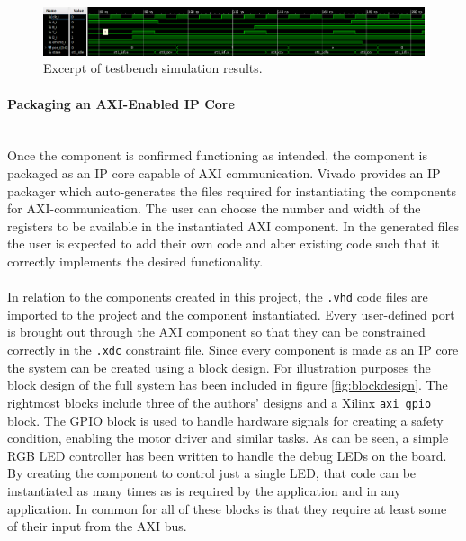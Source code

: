 \begin{figure}[h]
	\centering
	\includegraphics[width=\linewidth]{graphics/test_bench_narrow}
	\caption{Excerpt of testbench simulation results.}
	\label{fig:testbench}
\end{figure}

\paragraph{Packaging an AXI-Enabled IP Core}~\\ %
\label{par:ip_cores}
Once the component is confirmed functioning as intended, the component is packaged as an IP core capable of AXI communication.
Vivado provides an IP packager which auto-generates the files required for instantiating the components for AXI-communication.
The user can choose the number and width of the registers to be available in the instantiated AXI component.
In the generated files the user is expected to add their own code and alter existing code such that it correctly implements the desired functionality.
\\~\\
In relation to the components created in this project, the \texttt{.vhd} code files are imported to the project and the component instantiated.
Every user-defined port is brought out through the AXI component so that they can be constrained correctly in the \texttt{.xdc} constraint file.
Since every component is made as an IP core the system can be created using a block design.
For illustration purposes the block design of the full system has been included in figure \ref{fig:blockdesign}.
The rightmost blocks include three of the authors' designs and a Xilinx \texttt{axi\_gpio} block.
The GPIO block is used to handle hardware signals for creating a safety condition, enabling the motor driver and similar tasks.
As can be seen, a simple RGB LED controller has been written to handle the debug LEDs on the board.
By creating the component to control just a single LED, that code can be instantiated as many times as is required by the application and in any application.
In common for all of these blocks is that they require at least some of their input from the AXI bus.

